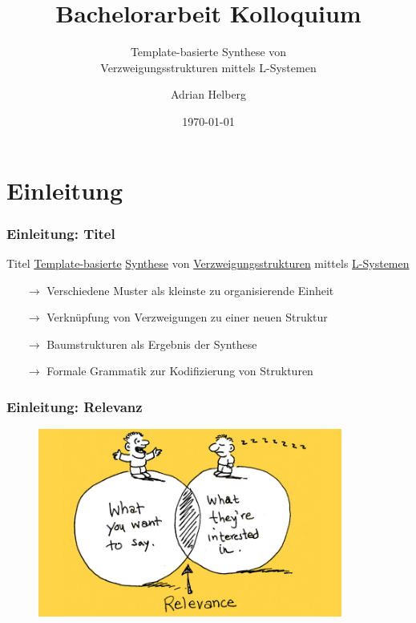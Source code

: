 \documentclass[12pt]{beamer}
\subtitle{Template-basierte Synthese von\\Verzweigungsstrukturen mittels L-Systemen}
\title{Bachelorarbeit Kolloquium}
\author{Adrian Helberg}
\institute{HAW Hamburg}
\date{\today}
\begin{document}
    \frame{\titlepage}

    \section{Einleitung}
    \label{sec:thema}
    \begin{frame}[allowframebreaks]
        \frametitle{Einleitung: Titel}

        \begin{block}{Titel}
            \color{olive}\underline{\color{black}Template-basierte} \color{teal}\underline{\color{black}Synthese} 
            \color{black}von \color{orange}\underline{\color{black}Verzweigungsstrukturen} \color{black}mittels 
            \color{cyan}\underline{\color{black}L-Systemen}
        \end{block}

        \begin{itemize}
            \item[\color{olive}$\rightarrow$] \color{black}Verschiedene Muster als kleinste zu organisierende Einheit
            \item[\color{teal}$\rightarrow$] \color{black}Verknüpfung von Verzweigungen zu einer neuen Struktur
            \item[\color{orange}$\rightarrow$] \color{black}Baumstrukturen als Ergebnis der Synthese
            \item[\color{cyan}$\rightarrow$] \color{black}Formale Grammatik zur Kodifizierung von Strukturen
        \end{itemize}
    \end{frame}

    \begin{frame}
        \frametitle{Einleitung: Relevanz}

        \begin{figure}
            \centering
            \includegraphics[width=10cm]{../images/relevanz.jpg}
        \end{figure}
    \end{frame}
\end{document}
